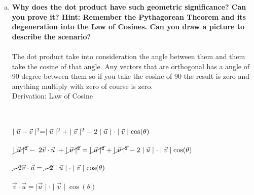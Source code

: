 \documentclass{article}
\begin{document}
\begin{enumerate}[b.]
	\item \textbf{Why does the dot product have such geometric significance? Can you prove it? Hint: Remember the Pythagorean Theorem and its degeneration into the Law of Cosines. Can
you draw a picture to describe the scenario? }\\
	\\
	The dot product take into consideration the angle between them and them take the cosine of that angle. Any vectors that are orthogonal has a angle of 90 degree between them so if you take the cosine of 90 the result is zero and anything multiply with zero of course is zero.\\
	
	Derivation: Law of Cosine\\
	\\
\\
	$\mid\vec{u}-\vec{v}\mid^{2} = \mid\vec{u}\mid^{2} + \mid\vec{v}\mid^{2}-\hspace{.1cm}2\mid\vec{u}\mid\cdot\mid\vec{v}\mid\cos(\theta)$\\
\\
$\cancel{\mid\vec{u}\mid^{2}}-\hspace{.1cm}2\vec{v}\cdot\vec{u}\hspace{.1cm}+\cancel{\mid\vec{v}\mid^{2}}=\cancel{\mid\vec{u}\mid^{2}} + \cancel{\mid\vec{v}\mid^{2}}-2\mid\vec{u}\mid\cdot\mid\vec{v}\mid\cos(\theta)$\\
\\
$\cancel{-2}\vec{v}\cdot\vec{u} = \cancel{-2}\mid\vec{u}\mid\cdot\mid\vec{v}\mid\cos(\theta)$\\
\\
$\vec{v}\cdot\vec{u} = \mid\vec{u}\mid\cdot\mid\vec{v}\mid\cos(\theta)$\\
\end{enumerate}
\end{document}
